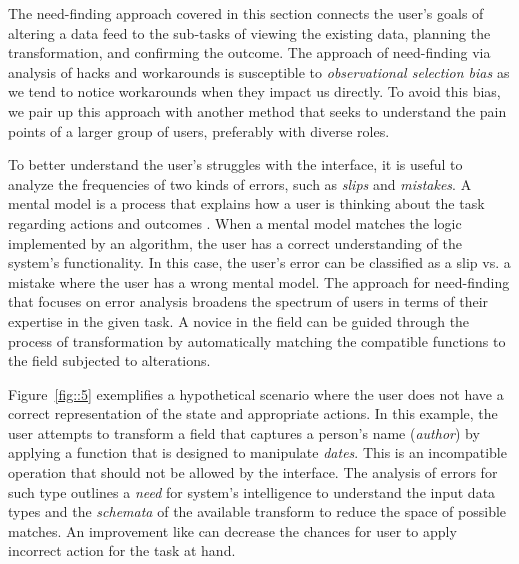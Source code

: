 \documentclass[12pt,letterpaper]{article}
\begin{document}

The need-finding approach covered in this section connects the user's goals of altering a data feed to the sub-tasks of viewing the existing data, planning the transformation, and confirming the outcome. The approach of need-finding via analysis of hacks and workarounds is susceptible to \textit{observational selection bias} as we tend to notice workarounds when they impact us directly. To avoid this bias, we pair up this approach with another method that seeks to understand the pain points of a larger group of users, preferably with diverse roles.


To better understand the user's struggles with the interface, it is useful to analyze the frequencies of two kinds of errors, such as \textit{slips} and \textit{mistakes}. A mental model is a process that explains how a user is thinking about the task regarding actions and outcomes \cite{wiki:mental_model}. When a mental model matches the logic implemented by an algorithm, the user has a correct understanding of the system's functionality. In this case, the user's error can be classified as a slip vs. a mistake where the user has a wrong mental model. The approach for need-finding that focuses on error analysis broadens the spectrum of users in terms of their expertise in the given task. A novice in the field can be guided through the process of transformation by automatically matching the compatible functions to the field subjected to alterations. 

Figure~\ref{fig::5} exemplifies a hypothetical scenario where the user does not have a correct representation of the state and appropriate actions. In this example, the user attempts to transform a field that captures a person's name (\textit{author}) by applying a function that is designed to manipulate \textit{dates}. This is an incompatible operation that should not be allowed by the interface. The analysis of errors for such type outlines a \textit{need} for system's intelligence to understand the input data types and the \textit{schemata} of the available transform to reduce the space of possible matches. An improvement like can decrease the chances for user to apply incorrect action for the task at hand.   
\end{document}

